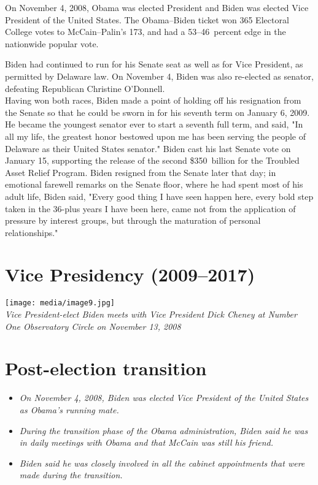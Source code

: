 On November 4, 2008, Obama was elected President and Biden was elected
Vice President of the United States. The Obama--Biden ticket won 365
Electoral College votes to McCain--Palin's 173, and had a 53--46~percent
edge in the nationwide popular vote.

Biden had continued to run for his Senate seat as well as for Vice
President, as permitted by Delaware law. On November 4, Biden was also
re-elected as senator, defeating Republican Christine O'Donnell.\\
Having won both races, Biden made a point of holding off his resignation
from the Senate so that he could be sworn in for his seventh term on
January 6, 2009. He became the youngest senator ever to start a seventh
full term, and said, "In all my life, the greatest honor bestowed upon
me has been serving the people of Delaware as their United States
senator." Biden cast his last Senate vote on January 15, supporting the
release of the second \$350~billion for the Troubled Asset Relief
Program. Biden resigned from the Senate later that day; in emotional
farewell remarks on the Senate floor, where he had spent most of his
adult life, Biden said, "Every good thing I have seen happen here, every
bold step taken in the 36-plus years I have been here, came not from the
application of pressure by interest groups, but through the maturation
of personal relationships."

\section{Vice Presidency (2009--2017)}\label{vice-presidency-20092017}

\texttt{[image: media/image9.jpg]}\\
\emph{Vice President-elect Biden meets with Vice President Dick Cheney
at Number One Observatory Circle on November 13, 2008}

\section{Post-election transition}\label{post-election-transition}

\begin{itemize}
\item
  \emph{On November 4, 2008, Biden was elected Vice President of the
  United States as Obama's running mate.}
\item
  \emph{During the transition phase of the Obama administration, Biden
  said he was in daily meetings with Obama and that McCain was still his
  friend.}
\item
  \emph{Biden said he was closely involved in all the cabinet
  appointments that were made during the transition.}
\end{itemize}

